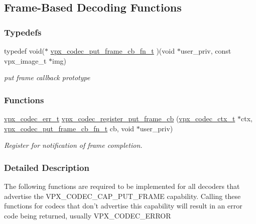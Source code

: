 \hypertarget{group__cap__put__frame}{\subsection{\-Frame-\/\-Based \-Decoding \-Functions}
\label{group__cap__put__frame}
}
\subsubsection*{\-Typedefs}
\begin{DoxyCompactItemize}
\item 
typedef void($\ast$ \hyperlink{group__cap__put__frame_ga1c3d3d07ec4f907dc426bbd6d70862ec}{vpx\-\_\-codec\-\_\-put\-\_\-frame\-\_\-cb\-\_\-fn\-\_\-t} )(void $\ast$user\-\_\-priv, const vpx\-\_\-image\-\_\-t $\ast$img)
\begin{DoxyCompactList}\small\item\em put frame callback prototype \end{DoxyCompactList}\end{DoxyCompactItemize}
\subsubsection*{\-Functions}
\begin{DoxyCompactItemize}
\item 
\hyperlink{group__codec_gada1084710837ad363b92f2379dd2b8d2}{vpx\-\_\-codec\-\_\-err\-\_\-t} \hyperlink{group__cap__put__frame_ga299c2d1b265a22a680f117dd686e31ce}{vpx\-\_\-codec\-\_\-register\-\_\-put\-\_\-frame\-\_\-cb} (\hyperlink{group__codec_gad03e2dfa6ae511db7d25be6bbb336233}{vpx\-\_\-codec\-\_\-ctx\-\_\-t} $\ast$ctx, \hyperlink{group__cap__put__frame_ga1c3d3d07ec4f907dc426bbd6d70862ec}{vpx\-\_\-codec\-\_\-put\-\_\-frame\-\_\-cb\-\_\-fn\-\_\-t} cb, void $\ast$user\-\_\-priv)
\begin{DoxyCompactList}\small\item\em \-Register for notification of frame completion. \end{DoxyCompactList}\end{DoxyCompactItemize}


\subsubsection{\-Detailed \-Description}
\-The following functions are required to be implemented for all decoders that advertise the \-V\-P\-X\-\_\-\-C\-O\-D\-E\-C\-\_\-\-C\-A\-P\-\_\-\-P\-U\-T\-\_\-\-F\-R\-A\-M\-E capability. \-Calling these functions for codecs that don't advertise this capability will result in an error code being returned, usually \-V\-P\-X\-\_\-\-C\-O\-D\-E\-C\-\_\-\-E\-R\-R\-O\-R 

